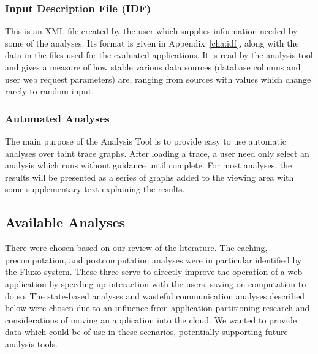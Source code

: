 \documentclass[msc,oneside]{ubcthesis}
\begin{document}




\subsubsection{Input Description File (IDF)}
\label{sec:idf}
This is an XML file created by the user which supplies information needed by some of the analyses. Its format is given in Appendix~\ref{cha:idf}, along with the data in the files used for the evaluated applications. It is read by the analysis tool and gives a measure of how stable various data sources (database columns and user web request parameters) are, ranging from sources with values which change rarely to random input.

\subsubsection{Automated Analyses}
The main purpose of the Analysis Tool is to provide easy to use automatic analyses over taint trace graphs. After loading a trace, a user need only select an analysis which runs without guidance until complete. For most analyses, the results will be presented as a series of graphs added to the viewing area with some supplementary text explaining the results.

\subsection{Available Analyses}

There were chosen based on our review of the literature. The caching, precomputation, and postcomputation analyses were in particular identified by the Fluxo \cite{Kiciman2010} system. These three serve to directly improve the operation of a web application by speeding up interaction with the users, saving on computation to do so. The state-based analyses and wasteful communication analyses described below were chosen due to an influence from application partitioning research and considerations of moving an application into the cloud. We wanted to provide data which could be of use in these scenarios, potentially supporting future analysis tools.
\end{document}
